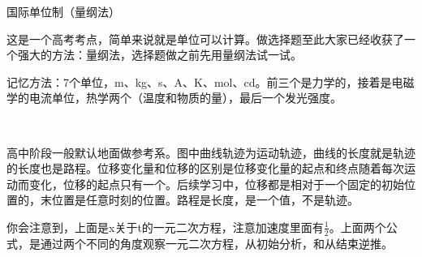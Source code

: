 \documentclass[a4paper, 12pt]{article}
\newcommand{\defitem}[2]{
\noindent \textsf{#1} \hspace{1em} \itshape{#2} \\
}
\newcommand{\noticebox}[1]{
  \begin{arcbox}
    \normalfont #1
  \end{arcbox}
}
\begin{document}
\defitem{国际单位制（量纲法）}{
  这是一个高考考点，简单来说就是单位可以计算。做选择题至此大家已经收获了一个强大的方法：量纲法，选择题做之前先用量纲法试一试。

  记忆方法：7个单位，m、kg、s、A、K、mol、cd。前三个是力学的，接着是电磁学的电流单位，热学两个（温度和物质的量），最后一个发光强度。
}

\noticebox{
  高中阶段一般默认地面做参考系。图中曲线轨迹为运动轨迹，曲线的长度就是轨迹的长度也是路程。位移变化量和位移的区别是位移变化量的起点和终点随着每次运动而变化，位移的起点只有一个。后续学习中，位移都是相对于一个固定的初始位置的，末位置是任意时刻的位置。路程是长度，是一个值，不是轨迹。

  你会注意到，上面是x关于t的一元二次方程，注意加速度里面有$\frac12$。上面两个公式，是通过两个不同的角度观察一元二次方程，从初始分析，和从结束逆推。
}
\end{document}
